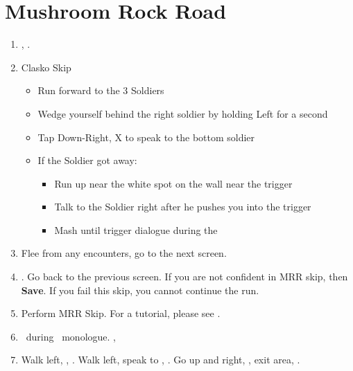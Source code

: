 \chapter{Mushroom Rock Road}

\begin{enumerate}
    \item \sd, \cs.
    \item Clasko Skip
    \begin{itemize}
        \item Run forward to the 3 Soldiers
        \item Wedge yourself behind the right soldier by holding Left for a second
        \item Tap Down-Right, X to speak to the bottom soldier
        \item If the Soldier got away:
        \begin{itemize}
            \item Run up near the white spot on the wall near the trigger
            \item Talk to the Soldier right after he pushes you into the trigger
            \item Mash until trigger dialogue during the \cs
        \end{itemize}
    \end{itemize}
    \item Flee from any encounters, go to the next screen.
    \item \save. Go back to the previous screen. If you are not confident in MRR skip, then \textbf{Save}. If you fail this skip, you cannot continue the run.
    \item Perform MRR Skip. For a tutorial, please see .
    \item \sd\ during \tidus\ monologue. \cs[1:00], \sd
    \item Walk left, \save, \sd. Walk left, speak to \auron, \sd. Go up and right, \sd, exit area, \sd.
\end{enumerate}
